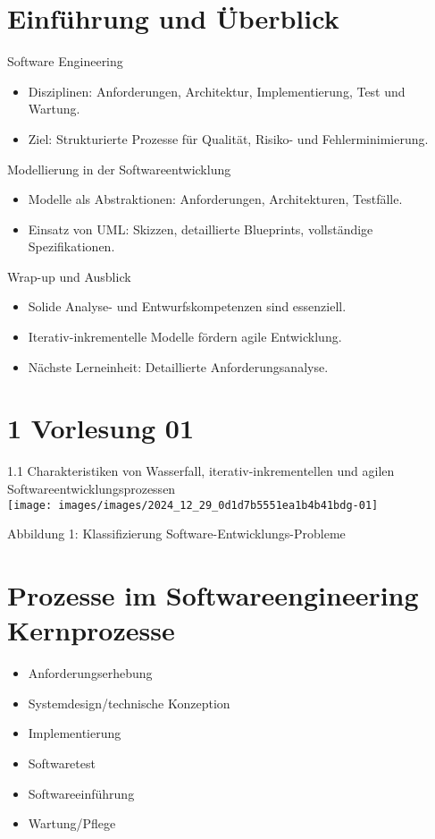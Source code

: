 \section{Einführung und Überblick}

\begin{definition}{Software Engineering}
\begin{itemize}
    \item Disziplinen: Anforderungen, Architektur, Implementierung, Test und Wartung.
    \item Ziel: Strukturierte Prozesse für Qualität, Risiko- und Fehlerminimierung.
\end{itemize}
\end{definition}

\begin{definition}{Modellierung in der Softwareentwicklung}
\begin{itemize}
    \item Modelle als Abstraktionen: Anforderungen, Architekturen, Testfälle.
    \item Einsatz von UML: Skizzen, detaillierte Blueprints, vollständige Spezifikationen.
    \end{itemize}
\end{definition}

\begin{definition}{Wrap-up und Ausblick}
\begin{itemize}
    \item Solide Analyse- und Entwurfskompetenzen sind essenziell.
    \item Iterativ-inkrementelle Modelle fördern agile Entwicklung.
    \item Nächste Lerneinheit: Detaillierte Anforderungsanalyse.
\end{itemize}
\end{definition}

\section*{1 Vorlesung 01}
1.1 Charakteristiken von Wasserfall, iterativ-inkrementellen und agilen Softwareentwicklungsprozessen\\
\texttt{[image: images/images/2024\_12\_29\_0d1d7b5551ea1b4b41bdg-01]}

Abbildung 1: Klassifizierung Software-Entwicklungs-Probleme

\section*{Prozesse im Softwareengineering Kernprozesse}
\begin{itemize}
  \item Anforderungserhebung
  \item Systemdesign/technische Konzeption
  \item Implementierung
  \item Softwaretest
  \item Softwareeinführung
  \item Wartung/Pflege
\end{itemize}

